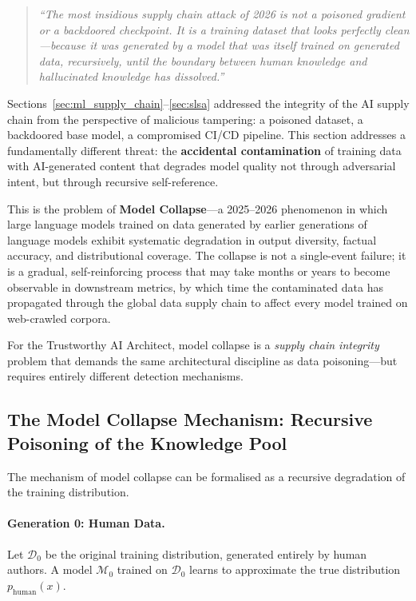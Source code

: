 \begin{quote}
\textit{``The most insidious supply chain attack of 2026 is not
a poisoned gradient or a backdoored checkpoint.
It is a training dataset that looks perfectly clean---because
it was generated by a model that was itself trained on
generated data, recursively, until the boundary between human
knowledge and hallucinated knowledge has dissolved.''}
\end{quote}

Sections~\ref{sec:ml_supply_chain}--\ref{sec:slsa} addressed
the integrity of the AI supply chain from the perspective of
malicious tampering: a poisoned dataset, a backdoored base model,
a compromised CI/CD pipeline.
This section addresses a fundamentally different threat: the
\textbf{accidental contamination} of training data with
AI-generated content that degrades model quality not through
adversarial intent, but through recursive self-reference.

This is the problem of \textbf{Model Collapse}---a 2025--2026
phenomenon in which large language models trained on data
generated by earlier generations of language models exhibit
systematic degradation in output diversity, factual accuracy,
and distributional coverage.
The collapse is not a single-event failure; it is a gradual,
self-reinforcing process that may take months or years to
become observable in downstream metrics, by which time the
contaminated data has propagated through the global data
supply chain to affect every model trained on web-crawled
corpora.

For the Trustworthy AI Architect, model collapse is a
\emph{supply chain integrity} problem that demands the same
architectural discipline as data poisoning---but requires
entirely different detection mechanisms.

\subsection{The Model Collapse Mechanism: Recursive Poisoning
            of the Knowledge Pool}
\label{subsec:model-collapse-mechanism}

The mechanism of model collapse can be formalised as a
recursive degradation of the training distribution.

\paragraph{Generation 0: Human Data.}
Let $\mathcal{D}_0$ be the original training distribution,
generated entirely by human authors.
A model $\mathcal{M}_0$ trained on $\mathcal{D}_0$ learns to
approximate the true distribution $p_{\mathrm{human}}(x)$.

